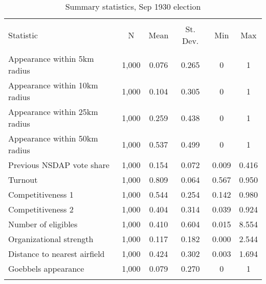 
\begin{table}[!htbp] \centering 
  \caption{Summary statistics, Sep 1930 election} 
  \label{tab:sumstats1930} 
\begin{tabular}{@{\extracolsep{5pt}}lccccc} 
\\[-1.8ex]\hline \\[-1.8ex] 
Statistic & \multicolumn{1}{c}{N} & \multicolumn{1}{c}{Mean} & \multicolumn{1}{c}{St. Dev.} & \multicolumn{1}{c}{Min} & \multicolumn{1}{c}{Max} \\ 
\hline \\[-1.8ex] 
Appearance within 5km radius & 1,000 & 0.076 & 0.265 & 0 & 1 \\ 
Appearance within 10km radius & 1,000 & 0.104 & 0.305 & 0 & 1 \\ 
Appearance within 25km radius & 1,000 & 0.259 & 0.438 & 0 & 1 \\ 
Appearance within 50km radius & 1,000 & 0.537 & 0.499 & 0 & 1 \\ 
Previous NSDAP vote share & 1,000 & 0.154 & 0.072 & 0.009 & 0.416 \\ 
Turnout & 1,000 & 0.809 & 0.064 & 0.567 & 0.950 \\ 
Competitiveness 1 & 1,000 & 0.544 & 0.254 & 0.142 & 0.980 \\ 
Competitiveness 2 & 1,000 & 0.404 & 0.314 & 0.039 & 0.924 \\ 
Number of eligibles & 1,000 & 0.410 & 0.604 & 0.015 & 8.554 \\ 
Organizational strength & 1,000 & 0.117 & 0.182 & 0.000 & 2.544 \\ 
Distance to nearest airfield & 1,000 & 0.424 & 0.302 & 0.003 & 1.694 \\ 
Goebbels appearance & 1,000 & 0.079 & 0.270 & 0 & 1 \\ 
\hline \\[-1.8ex] 
\end{tabular} 
\end{table} 

